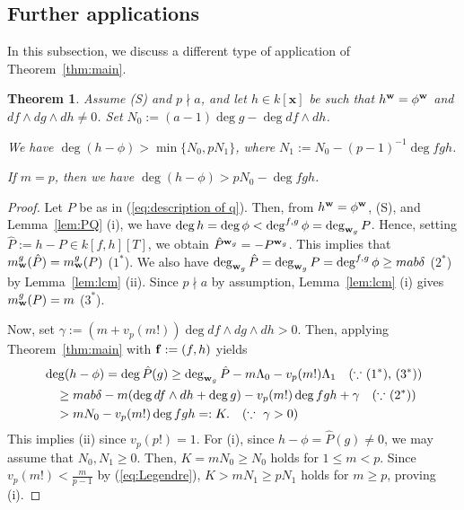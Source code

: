 \documentclass{amsart}
\theoremstyle{plain}
\newtheorem{thm}{Theorem}[section]
\theoremstyle{definition}
\newcommand{\nd}{\noindent}
\newcommand{\x}{{\boldsymbol x}}
\newcommand{\w}{{\bf w}}
\newcommand{\ff}{{\bf f}}
\newcommand{\kx}{k[\x]}
\begin{document}
\subsection{Further applications}


In this subsection, 
we discuss a different type of application of Theorem~\ref{thm:main}. 


\begin{thm}\label{cor:h-q}
Assume {\rm (S)} and $p\nmid a$, 
and let $h\in \kx $ be such that 
$h^{\w }=\phi ^{\w }$ and $df\wedge dg\wedge dh\ne 0$. 
Set $N_0:=(a-1)\deg g-\deg df\wedge dh$. 


\nd{\rm (i)} 
We have $\deg (h-\phi )>\min \{ N_0,pN_1\} $, 
where $N_1:=N_0-(p-1)^{-1}\deg fgh$. 


\nd{\rm (ii)} 
If $m=p$, 
then we have $\deg (h-\phi )>pN_0-\deg fgh$. 

\end{thm}



\begin{proof}
Let $P$ be as in (\ref{eq:description of q}). 
Then, from $h^{\w }=\phi ^{\w }$, 
(S), and Lemma~\ref{lem:PQ} (i), 
we have 
$\deg h=\deg \phi <\deg ^{f,g}\phi =\deg _{\w _g}P$. 
Hence, 
setting $\hat{P}:=h-P\in k[f,h][T]$, 
we obtain $\hat{P}^{\w _g}=-P^{\w _g}$. 
This implies that $m_{\w }^g(\hat{P})=m_{\w }^g(P)$ ($1^*$). 
We also have 
$\deg _{\w _g}\hat{P}=\deg _{\w _g}P=\deg ^{f,g}\phi \ge mab\delta $ ($2^*$) 
by Lemma~\ref{lem:lcm} (ii). 
Since $p\nmid a$ by assumption, 
Lemma~\ref{lem:lcm} (i) gives 
$m_{\w }^g(P)=m$ ($3^*$). 



Now, set $\gamma :=(m+v_p(m!))\deg df\wedge dg\wedge dh >0$. 
Then, 
applying Theorem~\ref{thm:main} with $\ff :=(f,h)$ yields 
\begin{equation*}\label{eq:thm:second conseq}
\begin{aligned}
&\deg (h-\phi )=\deg \hat{P}(g)
\ge \deg _{\w _g}\hat{P}-m\Lambda _0-v_p(m!)\Lambda _1 
\quad \text{($\because $ ($1^*$), ($3^*$))} \\ 
&\quad 
\ge mab\delta -m(\deg df\wedge dh+\deg g)-v_p(m!)\deg fgh +\gamma 
\quad \text{($\because $ ($2^*$))} \\ 
&\quad >mN_0-v_p(m!)\deg fgh =:K. 
\quad (\because \ \gamma >0)
\end{aligned}
\end{equation*}
This implies (ii) since $v_p(p!)=1$. 
For (i), 
since $h-\phi =\hat{P}(g)\ne 0$, 
we may assume that $N_0,N_1\ge 0$. 
Then, 
$K=mN_0\ge N_0$ holds for $1\le m<p$. 
Since $v_p(m!)<\frac{m}{p-1}$ by (\ref{eq:Legendre}), 
$K>mN_1\ge pN_1$ holds for $m\ge p$, 
proving (i). 
\end{proof}
\end{document}
